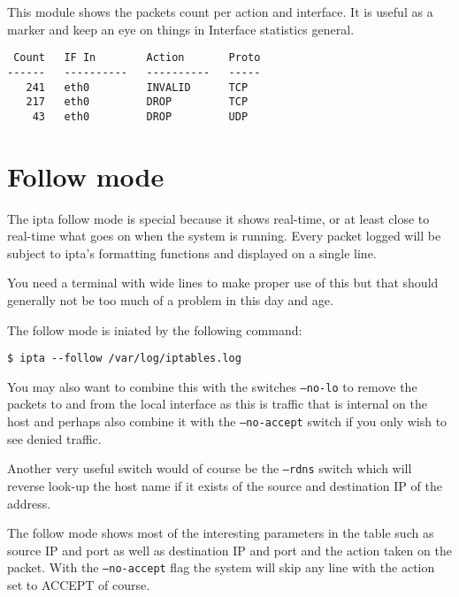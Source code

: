 \documentclass[english,twoside,openright,a4paper,12pt]{article}
\begin{document}
This module shows the packets count per action and interface. It is
useful as a marker and keep an eye on things in Interface statistics
general.

\footnotesize \begin{verbatim}
 Count   IF In        Action       Proto
------   ----------   ----------   -----
   241   eth0         INVALID      TCP      
   217   eth0         DROP         TCP      
    43   eth0         DROP         UDP      
\end{verbatim} \normalsize

\section{Follow mode}

The ipta follow mode is special because it shows real-time, or at
least close to real-time what goes on when the system is running.
Every packet logged will be subject to ipta's formatting functions and
displayed on a single line. 

You need a terminal with wide lines to make proper use of this but
that should generally not be too much of a problem in this day and
age.

The follow mode is iniated by the following command:

\begin{verbatim}
$ ipta --follow /var/log/iptables.log
\end{verbatim}

You may also want to combine this with the switches \texttt{--no-lo}
to remove the packets to and from the local interface as this is
traffic that is internal on the host and perhaps also combine it with
the \texttt{--no-accept} switch if you only wish to see denied
traffic.

Another very useful switch would of course be the \texttt{--rdns}
switch which will reverse look-up the host name if it exists of the
source and destination IP of the address.

The follow mode shows most of the interesting parameters in the table
such as source IP and port as well as destination IP and port and the
action taken on the packet. With the \texttt{--no-accept} flag the
system will skip any line with the action set to ACCEPT of course.
\end{document}
